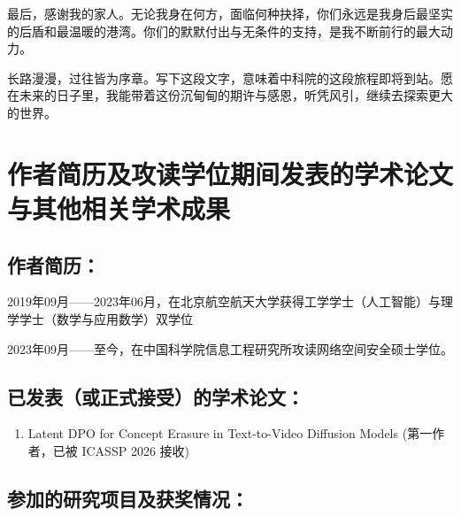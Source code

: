 最后，感谢我的家人。无论我身在何方，面临何种抉择，你们永远是我身后最坚实的后盾和最温暖的港湾。你们的默默付出与无条件的支持，是我不断前行的最大动力。

长路漫漫，过往皆为序章。写下这段文字，意味着中科院的这段旅程即将到站。愿在未来的日子里，我能带着这份沉甸甸的期许与感恩，听凭风引，继续去探索更大的世界。


\chapter{作者简历及攻读学位期间发表的学术论文与其他相关学术成果}

\section*{作者简历：}
2019年09月——2023年06月，在北京航空航天大学获得工学学士（人工智能）与理学学士（数学与应用数学）双学位

2023年09月——至今，在中国科学院信息工程研究所攻读网络空间安全硕士学位。

\section*{已发表（或正式接受）的学术论文：}

{
\setlist[enumerate]{}%
\begin{enumerate}[nosep]
    \item Latent DPO for Concept Erasure in Text-to-Video Diffusion Models (第一作者，已被 ICASSP 2026 接收) 
\end{enumerate}
}

\section*{参加的研究项目及获奖情况：}


\cleardoublepage[plain]%
